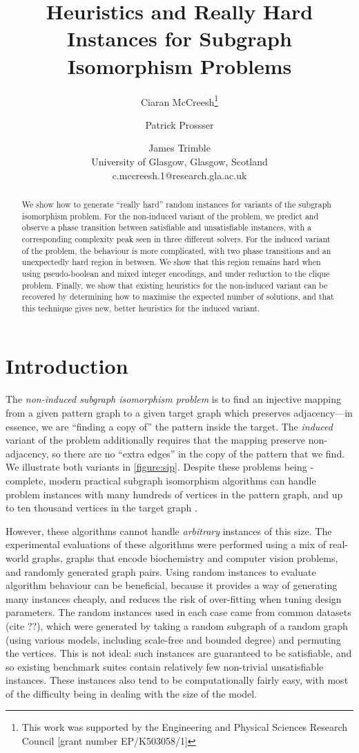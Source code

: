 \documentclass[letterpaper]{article}
\title{Heuristics and Really Hard Instances for Subgraph Isomorphism Problems}
\author{Ciaran McCreesh\thanks{This work was supported by the Engineering and Physical Sciences
    Research Council [grant number EP/K503058/1]} \and Patrick Prossser \and James Trimble \\
University of Glasgow, Glasgow, Scotland \\
c.mccreesh.1@research.gla.ac.uk}
\begin{document}
\maketitle

\begin{abstract}
    We show how to generate ``really hard'' random instances for variants of the subgraph
    isomorphism problem. For the non-induced variant of the problem, we predict and observe a phase
    transition between satisfiable and unsatisfiable instances, with a corresponding complexity peak
    seen in three different solvers. For the induced variant of the problem, the behaviour is more
    complicated, with two phase transitions and an unexpectedly hard region in between. We show that
    this region remains hard when using pseudo-boolean and mixed integer encodings, and under
    reduction to the clique problem. Finally, we show that existing heuristics for the non-induced
    variant can be recovered by determining how to maximise the expected number of solutions, and
    that this technique gives new, better heuristics for the induced variant.
\end{abstract}

\section{Introduction}

The \emph{non-induced subgraph isomorphism problem} is to find an injective mapping from a given
pattern graph to a given target graph which preserves adjacency---in essence, we are ``finding a
copy of'' the pattern inside the target. The \emph{induced} variant of the problem additionally
requires that the mapping preserve non-adjacency, so there are no ``extra edges'' in the copy of the
pattern that we find. We illustrate both variants in \cref{figure:sip}.
Despite these problems being \NP-complete, modern practical subgraph isomorphism algorithms can
handle problem instances with many hundreds of vertices in the pattern graph, and up to ten thousand
vertices in the target graph \citep{Cordella:2004,Solnon:2010,Audemard:2014,McCreesh:2015}.

However, these algorithms cannot handle \emph{arbitrary} instances of this size. The experimental
evaluations of these algorithms were performed using a mix of real-world graphs, graphs that encode
biochemistry and computer vision problems, and randomly generated graph pairs. Using random
instances to evaluate algorithm behaviour can be beneficial, because it provides a way of generating
many instances cheaply, and reduces the risk of over-fitting when tuning design parameters. The
random instances used in each case came from common datasets (cite ??), which were generated by
taking a random subgraph of a random graph (using various models, including scale-free and bounded
degree) and permuting the vertices.  This is not ideal: such instances are guaranteed to be
satisfiable, and so existing benchmark suites contain relatively few non-trivial unsatisfiable
instances. These instances also tend to be computationally fairly easy, with most of the difficulty
being in dealing with the size of the model.
\end{document}
